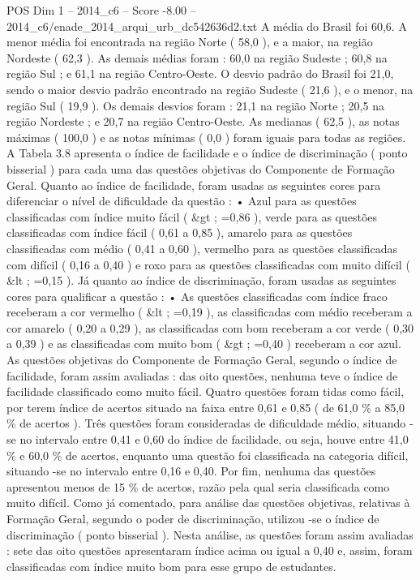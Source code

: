 \begin{textsample}{POS Dim 1 – 2014\_c6 – Score -8.00 – 2014\_c6/enade\_2014\_arqui\_urb\_dc542636d2.txt}
A média do Brasil foi 60,6.
A menor média foi encontrada na região Norte ( 58,0 ), e a maior, na região Nordeste ( 62,3 ).
As demais médias foram : 60,0 na região Sudeste ; 60,8 na região Sul ; e 61,1 na região Centro-Oeste.
O desvio padrão do Brasil foi 21,0, sendo o maior desvio padrão encontrado na região Sudeste ( 21,6 ), e o menor, na região Sul ( 19,9 ).
Os demais desvios foram : 21,1 na região Norte ; 20,5 na região Nordeste ; e 20,7 na região Centro-Oeste.
As medianas ( 62,5 ), as notas máximas ( 100,0 ) e as notas mínimas ( 0,0 ) foram iguais para todas as regiões.
A Tabela 3.8 apresenta o índice de facilidade e o índice de discriminação ( ponto bisserial ) para cada uma das questões objetivas do Componente de Formação Geral.
Quanto ao índice de facilidade, foram usadas as seguintes cores para diferenciar o nível de dificuldade da questão : • Azul para as questões classificadas com índice muito fácil ( \&gt ; =0,86 ), verde para as questões classificadas com índice fácil ( 0,61 a 0,85 ), amarelo para as questões classificadas com médio ( 0,41 a 0,60 ), vermelho para as questões classificadas com difícil ( 0,16 a 0,40 ) e roxo para as questões classificadas com muito difícil ( \&lt ; =0,15 ).
Já quanto ao índice de discriminação, foram usadas as seguintes cores para qualificar a questão : • As questões classificadas com índice fraco receberam a cor vermelho ( \&lt ; =0,19 ), as classificadas com médio receberam a cor amarelo ( 0,20 a 0,29 ), as classificadas com bom receberam a cor verde ( 0,30 a 0,39 ) e as classificadas com muito bom ( \&gt ; =0,40 ) receberam a cor azul.
As questões objetivas do Componente de Formação Geral, segundo o índice de facilidade, foram assim avaliadas : das oito questões, nenhuma teve o índice de facilidade classificado como muito fácil.
Quatro questões foram tidas como fácil, por terem índice de acertos situado na faixa entre 0,61 e 0,85 ( de 61,0 \% a 85,0 \% de acertos ).
Três questões foram consideradas de dificuldade médio, situando -se no intervalo entre 0,41 e 0,60 do índice de facilidade, ou seja, houve entre 41,0 \% e 60,0 \% de acertos, enquanto uma questão foi classificada na categoria difícil, situando -se no intervalo entre 0,16 e 0,40.
Por fim, nenhuma das questões apresentou menos de 15 \% de acertos, razão pela qual seria classificada como muito difícil.
Como já comentado, para análise das questões objetivas, relativas à Formação Geral, segundo o poder de discriminação, utilizou -se o índice de discriminação ( ponto bisserial ).
Nesta análise, as questões foram assim avaliadas : sete das oito questões apresentaram índice acima ou igual a 0,40 e, assim, foram classificadas com índice muito bom para esse grupo de estudantes.

\end{textsample}
